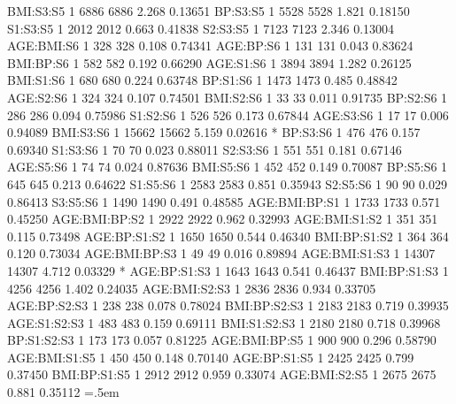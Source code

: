 \documentclass[runningheads]{llncs}
\newenvironment{lcverbatim}
 {\SaveVerbatim{cverb}}
 {\endSaveVerbatim
  \flushleft\fboxrule=0pt\fboxsep=.5em
  \colorbox{cverbbg}{%
    \makebox[\dimexpr\linewidth-2\fboxsep][l]{\BUseVerbatim{cverb}}%
  }
  \endflushleft
}
\begin{document}
\begin{lcverbatim}
BMI:S3:S5               1   6886    6886   2.268  0.13651    
BP:S3:S5                1   5528    5528   1.821  0.18150    
S1:S3:S5                1   2012    2012   0.663  0.41838    
S2:S3:S5                1   7123    7123   2.346  0.13004    
AGE:BMI:S6              1    328     328   0.108  0.74341    
AGE:BP:S6               1    131     131   0.043  0.83624    
BMI:BP:S6               1    582     582   0.192  0.66290    
AGE:S1:S6               1   3894    3894   1.282  0.26125    
BMI:S1:S6               1    680     680   0.224  0.63748    
BP:S1:S6                1   1473    1473   0.485  0.48842    
AGE:S2:S6               1    324     324   0.107  0.74501    
BMI:S2:S6               1     33      33   0.011  0.91735    
BP:S2:S6                1    286     286   0.094  0.75986    
S1:S2:S6                1    526     526   0.173  0.67844    
AGE:S3:S6               1     17      17   0.006  0.94089    
BMI:S3:S6               1  15662   15662   5.159  0.02616 *  
BP:S3:S6                1    476     476   0.157  0.69340    
S1:S3:S6                1     70      70   0.023  0.88011    
S2:S3:S6                1    551     551   0.181  0.67146    
AGE:S5:S6               1     74      74   0.024  0.87636    
BMI:S5:S6               1    452     452   0.149  0.70087    
BP:S5:S6                1    645     645   0.213  0.64622    
S1:S5:S6                1   2583    2583   0.851  0.35943    
S2:S5:S6                1     90      90   0.029  0.86413    
S3:S5:S6                1   1490    1490   0.491  0.48585    
AGE:BMI:BP:S1           1   1733    1733   0.571  0.45250    
AGE:BMI:BP:S2           1   2922    2922   0.962  0.32993    
AGE:BMI:S1:S2           1    351     351   0.115  0.73498    
AGE:BP:S1:S2            1   1650    1650   0.544  0.46340    
BMI:BP:S1:S2            1    364     364   0.120  0.73034    
AGE:BMI:BP:S3           1     49      49   0.016  0.89894    
AGE:BMI:S1:S3           1  14307   14307   4.712  0.03329 *  
AGE:BP:S1:S3            1   1643    1643   0.541  0.46437    
BMI:BP:S1:S3            1   4256    4256   1.402  0.24035    
AGE:BMI:S2:S3           1   2836    2836   0.934  0.33705    
AGE:BP:S2:S3            1    238     238   0.078  0.78024    
BMI:BP:S2:S3            1   2183    2183   0.719  0.39935    
AGE:S1:S2:S3            1    483     483   0.159  0.69111    
BMI:S1:S2:S3            1   2180    2180   0.718  0.39968    
BP:S1:S2:S3             1    173     173   0.057  0.81225    
AGE:BMI:BP:S5           1    900     900   0.296  0.58790    
AGE:BMI:S1:S5           1    450     450   0.148  0.70140    
AGE:BP:S1:S5            1   2425    2425   0.799  0.37450    
BMI:BP:S1:S5            1   2912    2912   0.959  0.33074    
AGE:BMI:S2:S5           1   2675    2675   0.881  0.35112    
\end{lcverbatim}
\end{document}
